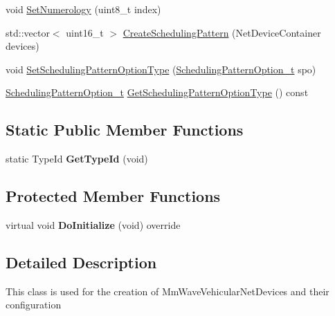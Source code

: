 \begin{DoxyCompactItemize}
\item 
void \hyperlink{classns3_1_1millicar_1_1MmWaveVehicularHelper_a8653a3225aa1df7ef17eb9ed3d6ebab9}{Set\+Numerology} (uint8\+\_\+t index)
\item 
std\+::vector$<$ uint16\+\_\+t $>$ \hyperlink{classns3_1_1millicar_1_1MmWaveVehicularHelper_a6bc119194b9aa09c56d9f9e529e2e09a}{Create\+Scheduling\+Pattern} (Net\+Device\+Container devices)
\item 
void \hyperlink{classns3_1_1millicar_1_1MmWaveVehicularHelper_a909144ad73428efd96a27612757ec08a}{Set\+Scheduling\+Pattern\+Option\+Type} (\hyperlink{classns3_1_1millicar_1_1MmWaveVehicularHelper_a7b56a1dec16b395a2b07f3e2267bc8e8}{Scheduling\+Pattern\+Option\+\_\+t} spo)
\item 
\hyperlink{classns3_1_1millicar_1_1MmWaveVehicularHelper_a7b56a1dec16b395a2b07f3e2267bc8e8}{Scheduling\+Pattern\+Option\+\_\+t} \hyperlink{classns3_1_1millicar_1_1MmWaveVehicularHelper_a6d6431806df6b60f555880c26c21ce5e}{Get\+Scheduling\+Pattern\+Option\+Type} () const
\end{DoxyCompactItemize}
\subsection*{Static Public Member Functions}
\begin{DoxyCompactItemize}
\item 
\mbox{\label{classns3_1_1millicar_1_1MmWaveVehicularHelper_a281b5ef7548fe7c8a67b3deaaba28a29}} 
static Type\+Id {\bfseries Get\+Type\+Id} (void)
\end{DoxyCompactItemize}
\subsection*{Protected Member Functions}
\begin{DoxyCompactItemize}
\item 
\mbox{\label{classns3_1_1millicar_1_1MmWaveVehicularHelper_a606e9f24b4aee9d8e77cf476827dabf8}} 
virtual void {\bfseries Do\+Initialize} (void) override
\end{DoxyCompactItemize}


\subsection{Detailed Description}
This class is used for the creation of Mm\+Wave\+Vehicular\+Net\+Devices and their configuration 

